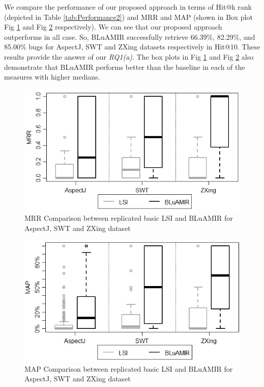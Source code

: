 \documentclass[conference]{IEEEtran}
\begin{document}
We compare the performance of our proposed approach in terms of Hit@k rank (depicted in Table \ref{tab:Performance2}) and MRR and MAP (shown in Box plot Fig \ref{box:LSI+AssoMRR} and Fig \ref{box:LSI+Asso-MAP} respectively). We can see that our proposed approach outperforms in all case. So, BLuAMIR successfully retrieve 66.39\%, 82.29\%, and 85.00\% bugs for AspectJ, SWT and ZXing datasets respectively in Hit@10. These results provide the answer of our \textit{RQ1(a)}. The box plots in Fig \ref{box:LSI+AssoMRR} and Fig \ref{box:LSI+Asso-MAP} also demonstrate that BLuAMIR performs better than the baseline in each of the measures with higher medians.
\begin{figure}
	\centering
	\includegraphics[scale=0.55]{comapre-mrr}
	\caption {MRR Comparison between replicated basic LSI and BLuAMIR for AspectJ, SWT and ZXing dataset}
	\label{box:LSI+AssoMRR}
\end{figure}
\begin{figure}
	\centering
	\includegraphics[scale=0.55]{compare-map-lsi-proposed}
	\caption {MAP Comparison between replicated basic LSI and BLuAMIR for AspectJ, SWT and ZXing dataset}
	\label{box:LSI+Asso-MAP}
\end{figure}
   
\end{document}

